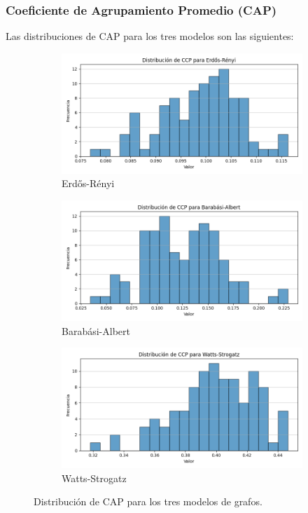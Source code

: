 \subsubsection{Coeficiente de Agrupamiento Promedio (CAP)}
Las distribuciones de CAP para los tres modelos son las siguientes:
\begin{figure}[ht!]
\centering
\begin{subfigure}{.32\textwidth}
  \centering
  \includegraphics[width=\linewidth]{images/CCP_er.png}
  \caption{Erdős-Rényi}
\end{subfigure}%
\begin{subfigure}{.32\textwidth}
  \centering
  \includegraphics[width=\linewidth]{images/CCP_ba.png}
  \caption{Barabási-Albert}
\end{subfigure}
\begin{subfigure}{.32\textwidth}
  \centering
  \includegraphics[width=\linewidth]{images/CCP_ws.png}
  \caption{Watts-Strogatz}
\end{subfigure}
\caption{Distribución de CAP para los tres modelos de grafos.}
\end{figure}

